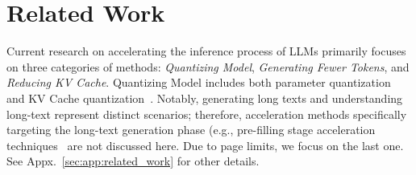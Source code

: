 \vspace{-1mm}
\section{Related Work}
\vspace{-1mm}
Current research on accelerating the inference process of LLMs primarily focuses on three categories of methods: \textit{Quantizing Model}, \textit{Generating Fewer Tokens}, and \textit{Reducing KV Cache}. 
Quantizing Model includes both parameter quantization~\cite{mlsys24_awq} and KV Cache quantization~\citep{icml24_kivi}. 
Notably, generating long texts and understanding long-text represent distinct 
scenarios; 
therefore, acceleration methods specifically targeting the long-text generation phase (e.g., pre-filling stage acceleration techniques~\citep{emnlp23_autocompressors,iclr24_icae,emnlp23_llmlingua,iclr25_activation_beacon,nips24_snapkv,arxiv24_pyramidkv} are not discussed here. 
Due to page limits, we focus on the last one. 
See Appx.~\ref{sec:app:related_work} for other details.


